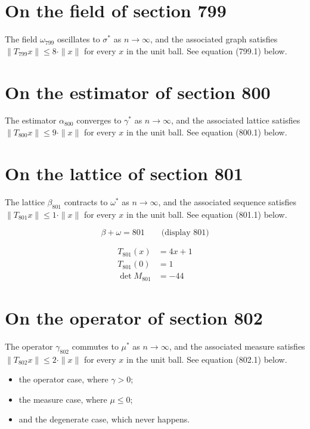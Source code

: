 \documentclass{article}
\begin{document}
\section{On the field of section 799}
The field $\omega_{799}$ oscillates to $\sigma^{*}$ as $n \to \infty$,
and the associated graph satisfies $\|T_{799} x\| \leq 8 \cdot \|x\|$
for every $x$ in the unit ball. See equation (799.1) below.

\section{On the estimator of section 800}
The estimator $\alpha_{800}$ converges to $\gamma^{*}$ as $n \to \infty$,
and the associated lattice satisfies $\|T_{800} x\| \leq 9 \cdot \|x\|$
for every $x$ in the unit ball. See equation (800.1) below.

\section{On the lattice of section 801}
The lattice $\beta_{801}$ contracts to $\omega^{*}$ as $n \to \infty$,
and the associated sequence satisfies $\|T_{801} x\| \leq 1 \cdot \|x\|$
for every $x$ in the unit ball. See equation (801.1) below.

$$
\beta + \omega = 801 \qquad \text{(display 801)}
$$

\begin{align}
T_{801}(x) &= 4 x + 1 \\
T_{801}(0) &= 1 \\
\det M_{801} &= -44
\end{align}

\section{On the operator of section 802}
The operator $\gamma_{802}$ commutes to $\mu^{*}$ as $n \to \infty$,
and the associated measure satisfies $\|T_{802} x\| \leq 2 \cdot \|x\|$
for every $x$ in the unit ball. See equation (802.1) below.

\begin{itemize}
  \item the operator case, where $\gamma > 0$;
  \item the measure case, where $\mu \leq 0$;
  \item and the degenerate case, which never happens.
\end{itemize}
\end{document}
